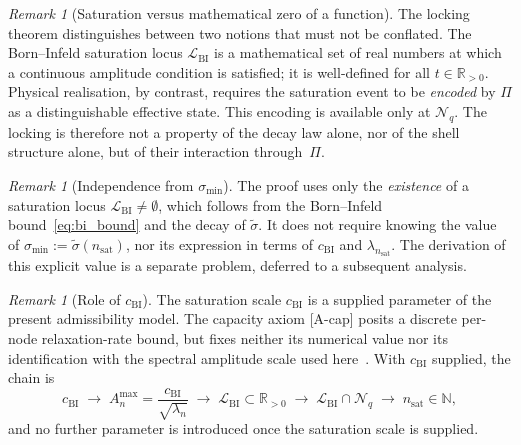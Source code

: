 \documentclass[12pt,a4paper]{article}
\theoremstyle{remark}
\newtheorem{remark}[theorem]{Remark}
\newcommand{\cchi}{c_{\mathrm{BI}}}
\newcommand{\Amax}{A_n^{\max}}
\newcommand{\nsat}{n_{\mathrm{sat}}}
\begin{document}
    \begin{remark}[Saturation versus mathematical zero of a function]
      \label{rem:saturation_vs_zero}
      The locking theorem distinguishes between two notions that must not be conflated.
      The Born--Infeld saturation locus $\mathcal{L}_{\mathrm{BI}}$ is a mathematical set of
      real numbers at which a continuous amplitude condition is satisfied; it is well-defined
      for all $t \in \mathbb{R}_{>0}$.
      Physical realisation, by contrast, requires the saturation event to be \emph{encoded}
      by $\Pi$ as a distinguishable effective state.
      This encoding is available only at $\mathcal{N}_q$.
      The locking is therefore not a property of the decay law alone, nor of the shell structure
      alone, but of their interaction through~$\Pi$.
    \end{remark}

    \begin{remark}[Independence from $\sigma_{\min}$]
      \label{rem:no_sigma_min}
      The proof uses only the \emph{existence} of a saturation locus $\mathcal{L}_{\mathrm{BI}}
      \neq \emptyset$, which follows from the Born--Infeld bound~\eqref{eq:bi_bound} and the
      decay of $\tilde{\sigma}$.
      It does not require knowing the value of $\sigma_{\min} := \tilde{\sigma}(\nsat)$,
      nor its expression in terms of $\cchi$ and $\lambda_{\nsat}$.
      The derivation of this explicit value is a separate problem, deferred to a subsequent
      analysis.
    \end{remark}

    \begin{remark}[Role of $\cchi$]
      \label{rem:c_chi}
      The saturation scale $\cchi$ is a supplied parameter of the present admissibility model.
      The capacity axiom [A-cap] posits a discrete per-node relaxation-rate bound, but fixes
      neither its numerical value nor its identification with the spectral amplitude scale
      used here~\cite{Beau2026c}.
      With $\cchi$ supplied, the chain is
      \begin{equation}
        \label{eq:chain_cchi}
        \cchi
        \;\longrightarrow\;
        \Amax = \frac{\cchi}{\sqrt{\lambda_n}}
        \;\longrightarrow\;
        \mathcal{L}_{\mathrm{BI}} \subset \mathbb{R}_{>0}
        \;\longrightarrow\;
        \mathcal{L}_{\mathrm{BI}} \cap \mathcal{N}_q
        \;\longrightarrow\;
        \nsat \in \mathbb{N},
      \end{equation}
      and no further parameter is introduced once the saturation scale is supplied.
    \end{remark}
\end{document}
